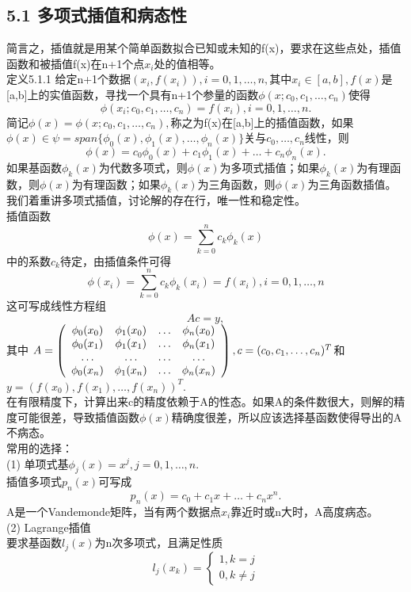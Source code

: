 \documentclass[a4paper,12pt]{article}
\begin{document}
\begin{CJK*}{UTF8}{gbsn}
	\section{5.1 多项式插值和病态性}
	简言之，插值就是用某个简单函数拟合已知或未知的f(x)，要求在这些点处，插值函数和被插值f(x)在n+1个点$x_i$处的值相等。\\
	定义5.1.1 给定n+1个数据$(x_i,f(x_i)),i=0,1,\ldots,n,$其中$x_i \in [a,b],f(x)$是[a,b]上的实值函数，寻找一个具有n+1个参量的函数$\phi(x;c_0,c_1,\ldots,c_n)$使得
	$$\phi(x_i;c_0,c_1,\ldots,c_n) = f(x_i),i=0,1,\ldots,n.$$
	简记$\phi(x)=\phi(x;c_0,c_1,\ldots,c_n),$称之为f(x)在[a,b]上的插值函数，如果$\phi(x)\in \psi=span\{\phi_0(x),\phi_1(x),\ldots,\phi_n(x)\}$关与$c_0,\ldots,c_n$线性，则
	$$\phi(x) = c_0\phi_0(x) + c_1\phi_1(x) + \ldots + c_n\phi_n(x).$$
	如果基函数$\phi_k(x)$为代数多项式，则$\phi(x)$为多项式插值；如果$\phi_k(x)$为有理函数，则$\phi(x)$为有理函数；如果$\phi_k(x)$为三角函数，则$\phi(x)$为三角函数插值。\\
	我们着重讲多项式插值，讨论解的存在行，唯一性和稳定性。\\
	插值函数
	$$ \phi(x) = \sum\limits_{k=0}^{n}c_k\phi_k(x) $$
	中的系数$c_k$待定，由插值条件可得
	$$ \phi(x_i) = \sum\limits_{k=0}^{n}c_k\phi_k(x_i) = f(x_i), i=0,1,\ldots,n $$
	这可写成线性方程组$$Ac = y,$$其中
	$A=\left(
	\begin{array}{cccc}
		\phi_0(x_0) & \phi_1(x_0) & \ldots &\phi_n(x_0) \\
		\phi_0(x_1) & \phi_1(x_1) & \ldots &\phi_n(x_1) \\
		\ldots	&	\ldots	&	\ldots	&	\ldots	\\
		\phi_0(x_n) & \phi_1(x_n) & \ldots &\phi_n(x_n) \\
	\end{array}\right),\\
	c=(c_0,c_1,\ldots,c_n)^T$和$y=(f(x_0),f(x_1),\ldots,f(x_n))^T$.\\
	在有限精度下，计算出来c的精度依赖于A的性态。如果A的条件数很大，则解的精度可能很差，导致插值函数$\phi(x)$精确度很差，所以应该选择基函数使得导出的A不病态。\\
	常用的选择：\\
	(1) 单项式基$\phi_j(x)=x^j,j=0,1,\ldots,n.$\\
	插值多项式$p_n(x)$可写成
	$$p_n(x)=c_0+c_1x+\ldots+c_nx^n.$$
	A是一个Vandemonde矩阵，当有两个数据点$x_i$靠近时或n大时，A高度病态。\\
	(2) Lagrange插值\\
	要求基函数$l_j(x)$为n次多项式，且满足性质
	$$l_j(x_k)= \begin{cases} 1,k=j\\0,k\neq j \end{cases} $$

\end{CJK*}
\end{document}
